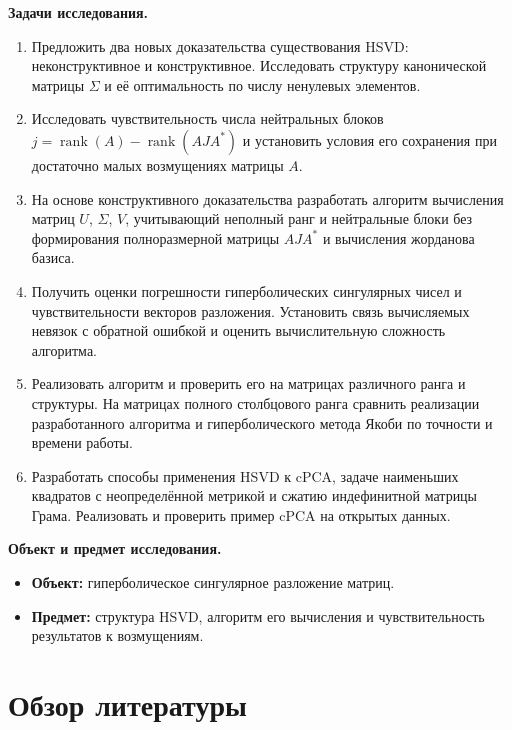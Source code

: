 \documentclass[a4paper,12pt]{article}
\DeclareMathOperator{\rank}{rank}
\theoremstyle{csstyle}
\begin{document}
\textbf{Задачи исследования.}
\begin{enumerate}
    \item Предложить два новых доказательства существования HSVD:
    неконструктивное и конструктивное.  Исследовать структуру
    канонической матрицы $\Sigma$ и её оптимальность
    по числу ненулевых элементов.

    \item Исследовать чувствительность числа нейтральных блоков
    $j=\rank(A)-\rank(AJA^*)$ и установить условия его сохранения
    при достаточно малых возмущениях матрицы $A$.

    \item На основе конструктивного доказательства разработать
    алгоритм вычисления матриц $U$, $\Sigma$, $V$, учитывающий
    неполный ранг и нейтральные блоки без формирования
    полноразмерной матрицы $AJA^*$ и вычисления жорданова базиса.
    
    \item Получить оценки погрешности гиперболических сингулярных
    чисел и чувствительности векторов разложения. Установить связь
    вычисляемых невязок с обратной ошибкой и оценить вычислительную сложность алгоритма.

    \item Реализовать алгоритм и проверить его на матрицах
    различного ранга и структуры. На матрицах полного столбцового
    ранга сравнить реализации разработанного алгоритма
    и гиперболического метода Якоби по точности и времени работы.

    \item Разработать способы применения HSVD к cPCA, задаче
    наименьших квадратов с неопределённой метрикой и сжатию
    индефинитной матрицы Грама. Реализовать и проверить пример cPCA на открытых данных.
\end{enumerate}

\textbf{Объект и предмет исследования.}
\begin{itemize}
    \item \textbf{Объект:} гиперболическое сингулярное разложение матриц.
    \item \textbf{Предмет:} структура HSVD, алгоритм его вычисления и чувствительность результатов к возмущениям.
\end{itemize}


\section{Обзор литературы}
\label{sec:literature}
\end{document}
